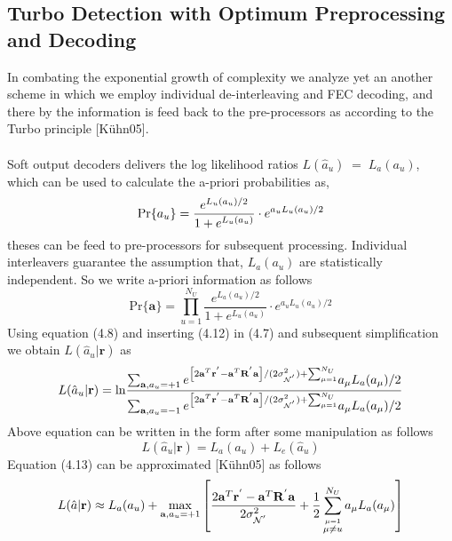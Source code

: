\subsection{Turbo Detection with Optimum Preprocessing and Decoding}
In combating the exponential growth of complexity we analyze yet an another scheme in which we employ individual de-interleaving and FEC decoding, and there by the information is feed back to the pre-processors as according to the Turbo principle [K\"uhn05]. \\ \\
Soft output decoders delivers the log likelihood ratios $L(\hat{a}_u)\;=\;L_a(a_u)$, which can be used to calculate the a-priori probabilities as,
\begin{equation}
\mathrm{Pr}\{a_u\}=\frac{\hbox{$e^{L_u(a_u)/2}$}}{\hbox{$1+e^{L_u(a_u)}$}}\cdot e^{a_uL_u(a_u)/2}
\end{equation}
theses can be feed to pre-processors for subsequent processing. Individual interleavers guarantee the assumption that, $L_a(a_u)$ are statistically independent. So we write a-priori information as follows
\begin{equation}
\mathrm{Pr}\{\mathrm{\mathbf{a}}\}=\prod\limits_{u=1}^{N_U}\frac{e^{L_a(a_u)/2}}{1+e^{L_u(a_u)}}\cdot e^{a_uL_u(a_u)/2}
\end{equation}
Using equation (4.8) and inserting (4.12) in (4.7) and subsequent simplification we obtain $L(\hat{a}_u\vert \mathrm{\mathbf{r}})$ as
\begin{equation}
L(\hat{a}_u\vert \mathrm{\mathbf{r}})=
\mathrm{ln}
\frac
{
\hbox{$\sum_{\mathrm{\mathbf{a}},a_u=+1}e^{\left[2\mathrm{\mathbf{a}}^T\mathrm{\mathbf{r}}^{'}-\mathrm{\mathbf{a}}^{T}\mathrm{\mathbf{R}}^{'}\mathrm{\mathbf{a}}\right]/(2\sigma^2_{\mathcal{N}^{'}})+\sum_{\mu = 1}^{N_U}}a_{\mu}L_a(a_{\mu})/2$}
}
{
\hbox{$\sum_{\mathrm{\mathbf{a}},a_u=-1}e^{\left[2\mathrm{\mathbf{a}}^T\mathrm{\mathbf{r}}^{'}-\mathrm{\mathbf{a}}^{T}\mathrm{\mathbf{R}}^{'}\mathrm{\mathbf{a}}\right]/(2\sigma^2_{\mathcal{N}^{'}})+\sum_{\mu = 1}^{N_U}}a_{\mu}L_a(a_{\mu})/2$}
}
\end{equation}
Above equation can be written in the form after some manipulation as follows
\begin{equation}
L(\hat{a}_u\vert \mathrm{\mathbf{r}})=L_a(a_u)+L_e(\hat{a}_u)
\end{equation}
Equation (4.13) can be approximated [K\"uhn05] as follows
\begin{equation*}
L(\hat{a}\vert \mathrm{\mathbf{r}})\approx L_a(a_u)
+\max_{\mathrm{\mathbf{a}},a_u=+1}\left[ \frac{\hbox{$2\mathrm{\mathbf{a}}^T\mathrm{\mathbf{r}}^{'}-\mathrm{\mathbf{a}}^T\mathrm{\mathbf{R}}^{'}\mathrm{\mathbf{a}}$}}{\hbox{$2\sigma^2_{\mathcal{N}^{'}}$}}+\frac{\hbox{$1$}}{\hbox{$2$}} \sum\limits_{\stackrel{\mu=1}{\mu \ne u}}^{N_U}a_{\mu}L_a(a_\mu) \right]
\end{equation*}
